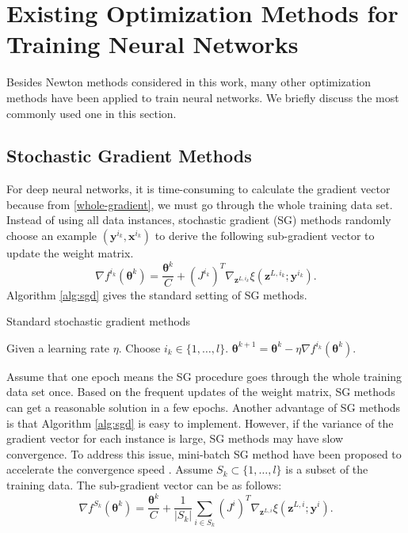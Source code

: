 \documentclass[12pt]{article}
\def\bx{{\boldsymbol x}}
\def\by{{\boldsymbol y}}
\def\bz{{\boldsymbol z}}
\def\btheta{\boldsymbol \theta}
\renewcommand{\baselinestretch}{2}
\begin{document}
\section{Existing Optimization Methods for Training Neural Networks}
\label{sec:Other-optimization}
Besides Newton methods considered in this work, many other optimization methods have been applied to train neural networks. We briefly discuss
the most commonly used one in this section.
\subsection{Stochastic Gradient Methods}
\label{subsec:SGD}
For deep neural networks, it is time-consuming to calculate the gradient vector because from \eqref{whole-gradient}, 
we must go through the whole training data set.
Instead of using all data instances, stochastic gradient (SG) methods randomly choose an example $(\by^{i_k},\bx^{i_k})$ to derive the following sub-gradient vector to
update the weight matrix.
\begin{equation*}
    \nabla f^{i_k}(\btheta^k) =  \frac{\btheta^k}{C} + (J^{i_k})^T \nabla_{\bz^{L,i_k}} \xi(\bz^{L,i_k};\by^{i_k}).
\end{equation*}
Algorithm \ref{alg:sgd} gives the standard setting of SG methods. 
\renewcommand{\baselinestretch}{1.3}
\begin{algorithm}[t]
  \caption{Standard stochastic gradient methods}
  \begin{algorithmic}[1]
  \State Given a learning rate $\eta$.
  	\State Choose $i_k \in \{1,\ldots,l\}$.
	\State $\btheta^{k+1} = \btheta^k - \eta \nabla f^{i_k}(\btheta^k)$.
  \EndFor
  \end{algorithmic}
  \label{alg:sgd}
\end{algorithm}
\renewcommand{\baselinestretch}{2}
\par Assume that one epoch means the SG procedure goes through the whole training data set once.
Based on the frequent updates of the weight matrix, SG methods can get a reasonable solution in a few epochs.
Another advantage of SG methods is that Algorithm \ref{alg:sgd} is easy to implement. 
However, if the variance of the gradient vector for each instance is large, SG methods may have slow convergence. 
To address this issue, mini-batch SG method have been proposed to accelerate the convergence speed \citep[e.g.,][]{LB91a,JD12a,JN11a,PB14a}. 
Assume $S_k \subset \{1,\ldots,l\}$ is a subset of the training data. The sub-gradient vector can be as follows:
\begin{equation*}
    \nabla f^{S_k}(\btheta^k) =  \frac{\btheta^k}{C} + \frac{1}{|S_k|} \sum_{i \in S_k} (J^{i})^T \nabla_{\bz^{L,i}} \xi(\bz^{L,i};\by^{i}).
\end{equation*}
\end{document}
